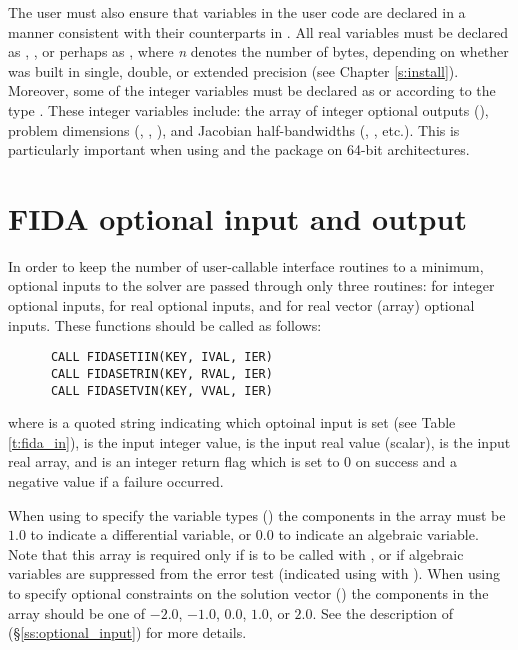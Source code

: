 The user must also ensure that variables in the user {\F} code are
declared in a manner consistent with their counterparts in {\ida}.
All real variables must be declared as , ,
or perhaps as , where {\em n} denotes the number of bytes,
depending on whether {\ida} was built in single, double, or extended precision 
(see Chapter \ref{s:install}). Moreover, some of the {\F} integer variables
must be declared as  or  according to the 
{\C} type . These integer variables include: the array of
integer optional outputs (), problem dimensions (,
, ), and Jacobian half-bandwidths (, , etc.).
This is particularly important when using {\ida} and the {\fida}
package on 64-bit architectures.

\section{FIDA optional input and output}

In order to keep the number of user-callable {\fida} interface routines to
a minimum, optional inputs to the {\ida} solver are passed through only
three routines:  for integer optional inputs, 
for real optional inputs, and  for real vector (array) optional
inputs.  These functions should be called as follows:
\begin{verbatim}
      CALL FIDASETIIN(KEY, IVAL, IER)
      CALL FIDASETRIN(KEY, RVAL, IER)
      CALL FIDASETVIN(KEY, VVAL, IER)
\end{verbatim}
where  is a quoted string indicating which optoinal input is set
(see Table \ref{t:fida_in}),  is the input integer value,
 is the input real value (scalar),
 is the input real array, and
 is an integer return flag which is set to $0$ on success and
a negative value if a failure occurred.

When using  to specify the variable types ()
the components in the array  must be $1.0$ to indicate a differential 
variable, or $0.0$ to indicate an algebraic variable.
Note that this array is required only if  is to be called
with , or if algebraic variables are suppressed from the error
test (indicated using  with ).
%
When using  to specify optional constraints on the
solution vector () the components in the
array  should be one of $-2.0$, $-1.0$, $0.0$, $1.0$, or $2.0$.
See the description of  (\S\ref{ss:optional_input})
for more details.


